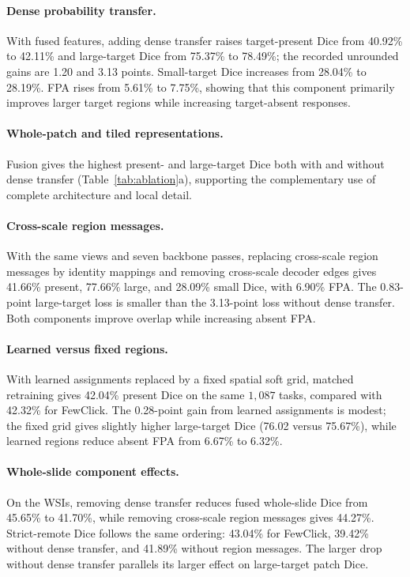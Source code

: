 \paragraph{Dense probability transfer.}
With fused features, adding dense transfer raises target-present Dice from 40.92\% to 42.11\% and large-target Dice from 75.37\% to 78.49\%; the recorded unrounded gains are 1.20 and 3.13 points. Small-target Dice increases from 28.04\% to 28.19\%. FPA rises from 5.61\% to 7.75\%, showing that this component primarily improves larger target regions while increasing target-absent responses.

\paragraph{Whole-patch and tiled representations.}
Fusion gives the highest present- and large-target Dice both with and without dense transfer (Table~\ref{tab:ablation}a), supporting the complementary use of complete architecture and local detail.

\paragraph{Cross-scale region messages.}
With the same views and seven backbone passes, replacing cross-scale region messages by identity mappings and removing cross-scale decoder edges gives 41.66\% present, 77.66\% large, and 28.09\% small Dice, with 6.90\% FPA. The 0.83-point large-target loss is smaller than the 3.13-point loss without dense transfer. Both components improve overlap while increasing absent FPA.

\paragraph{Learned versus fixed regions.}
With learned assignments replaced by a fixed spatial soft grid, matched retraining gives 42.04\% present Dice on the same $1{,}087$ tasks, compared with 42.32\% for FewClick. The 0.28-point gain from learned assignments is modest; the fixed grid gives slightly higher large-target Dice (76.02 versus 75.67\%), while learned regions reduce absent FPA from 6.67\% to 6.32\%.

\paragraph{Whole-slide component effects.}
On the WSIs, removing dense transfer reduces fused whole-slide Dice from 45.65\% to 41.70\%, while removing cross-scale region messages gives 44.27\%. Strict-remote Dice follows the same ordering: 43.04\% for FewClick, 39.42\% without dense transfer, and 41.89\% without region messages. The larger drop without dense transfer parallels its larger effect on large-target patch Dice.



